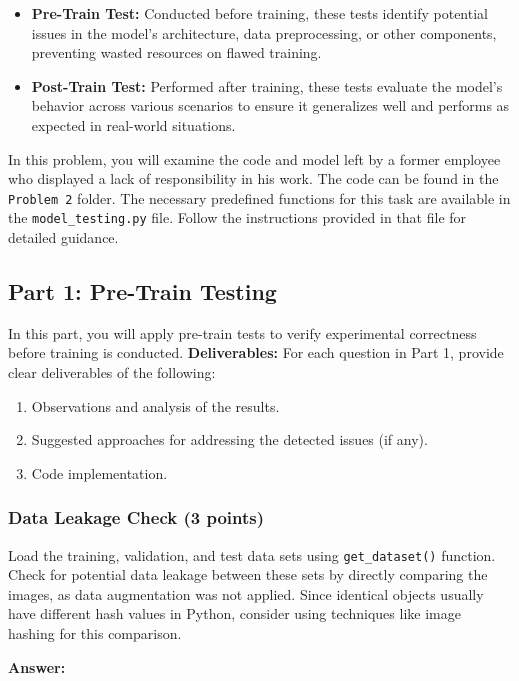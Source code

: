 \documentclass[11pt, oneside]{article}   	%
\begin{document}
\begin{itemize}
    \item \textbf{Pre-Train Test:} Conducted before training, these tests identify potential issues in the model's architecture, data preprocessing, or other components, preventing wasted resources on flawed training.
    \item \textbf{Post-Train Test:} Performed after training, these tests evaluate the model's behavior across various scenarios to ensure it generalizes well and performs as expected in real-world situations.
    
\end{itemize}

In this problem, you will examine the code and model left by a former employee who displayed a lack of responsibility in his work. The code can be found in the \texttt{Problem 2} folder. The necessary predefined functions for this task are available in the \texttt{model\_testing.py} file. Follow the instructions provided in that file for detailed guidance.

\subsection*{Part 1: Pre-Train Testing}

In this part, you will apply pre-train tests to verify experimental correctness before training is conducted. \noindent\textbf{Deliverables:} For each question in Part 1, provide clear deliverables of the following:
\begin{enumerate}
    \item Observations and analysis of the results.
    \item Suggested approaches for addressing the detected issues (if any).
    \item Code implementation.
\end{enumerate}

\subsubsection*{Data Leakage Check (3 points)}
Load the training, validation, and test data sets using \texttt{get\_dataset()} function. Check for potential data leakage between these sets by directly comparing the images, as data augmentation was not applied. Since identical objects usually have different hash values in Python, consider using techniques like image hashing for this comparison.

\begin{answerbox} \textbf{Answer:} \vspace*{1cm}

\end{answerbox}
\end{document}
